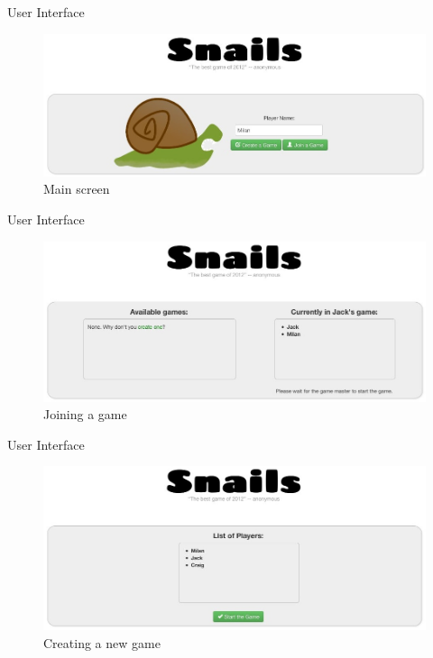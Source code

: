 \documentclass{beamer}
\begin{document}
\begin{frame}{User Interface}
  \begin{figure}[hb]
    \centering
    \includegraphics[scale=0.3]{index.jpg}
    \caption{Main screen}
  \end{figure}
\end{frame}

\begin{frame}{User Interface}
  \begin{figure}[hb]
    \centering
    \includegraphics[scale=0.3]{join.jpg}
    \caption{Joining a game}
  \end{figure}
\end{frame}

\begin{frame}{User Interface}
  \begin{figure}[hb]
    \centering
    \includegraphics[scale=0.3]{create.jpg}
    \caption{Creating a new game}
  \end{figure}
\end{frame}
\end{document}
